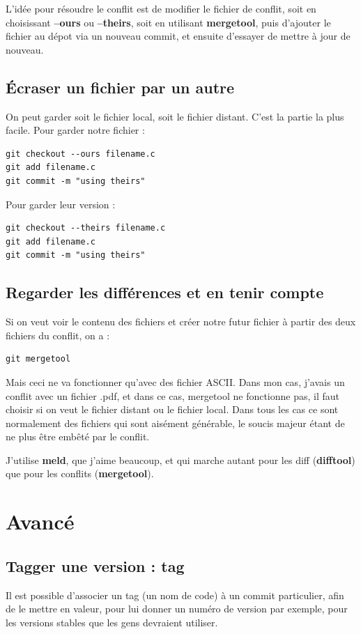 \documentclass[a4paper,twoside]{article}
\begin{document}
L'idée pour résoudre le conflit est de modifier le fichier de conflit, soit en choisissant \textbf{--ours} ou \textbf{--theirs}, soit en utilisant \textbf{mergetool}, puis d'ajouter le fichier au dépot via un nouveau commit, et ensuite d'essayer de mettre à jour de nouveau.

\subsection{Écraser un fichier par un autre}
On peut garder soit le fichier local, soit le fichier distant. C'est la partie la plus facile. Pour garder notre fichier :
\begin{verbatim}
git checkout --ours filename.c
git add filename.c
git commit -m "using theirs"
\end{verbatim}

Pour garder leur version :
\begin{verbatim}
git checkout --theirs filename.c
git add filename.c
git commit -m "using theirs"
\end{verbatim}

\subsection{Regarder les différences et en tenir compte}
Si on veut voir le contenu des fichiers et créer notre futur fichier à partir des deux fichiers du conflit, on a :
\begin{verbatim}
git mergetool
\end{verbatim}

Mais ceci ne va fonctionner qu'avec des fichier ASCII. Dans mon cas, j'avais un conflit avec un fichier .pdf, et dans ce cas, mergetool ne fonctionne pas, il faut choisir si on veut le fichier distant ou le fichier local. Dans tous les cas ce sont normalement des fichiers qui sont aisément générable, le soucis majeur étant de ne plus être embêté par le conflit.

\begin{remarque}
J'utilise \textbf{meld}, que j'aime beaucoup, et qui marche autant pour les diff (\textbf{difftool}) que pour les conflits (\textbf{mergetool}).
\end{remarque}

\section{Avancé}
\subsection{Tagger une version : tag}
Il est possible d'associer un tag (un nom de code) à un commit particulier, afin de le mettre en valeur, pour lui donner un numéro de version par exemple, pour les versions stables que les gens devraient utiliser.
\end{document}
